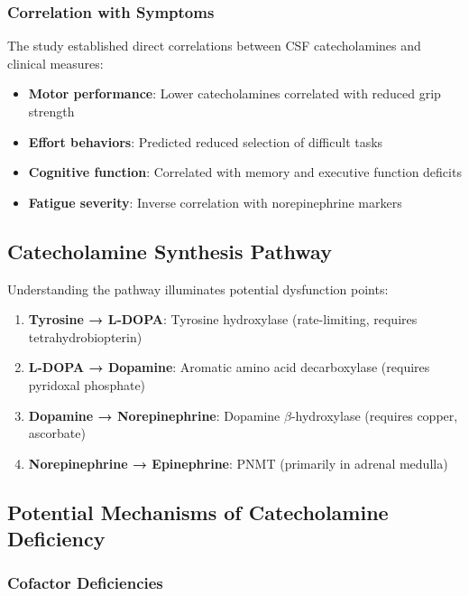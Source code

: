 \subsubsection{Correlation with Symptoms}

The study established direct correlations between CSF catecholamines and clinical measures:

\begin{itemize}
    \item \textbf{Motor performance}: Lower catecholamines correlated with reduced grip strength
    \item \textbf{Effort behaviors}: Predicted reduced selection of difficult tasks
    \item \textbf{Cognitive function}: Correlated with memory and executive function deficits
    \item \textbf{Fatigue severity}: Inverse correlation with norepinephrine markers
\end{itemize}

\subsection{Catecholamine Synthesis Pathway}

Understanding the pathway illuminates potential dysfunction points:

\begin{enumerate}
    \item \textbf{Tyrosine → L-DOPA}: Tyrosine hydroxylase (rate-limiting, requires tetrahydrobiopterin)
    \item \textbf{L-DOPA → Dopamine}: Aromatic amino acid decarboxylase (requires pyridoxal phosphate)
    \item \textbf{Dopamine → Norepinephrine}: Dopamine $\beta$-hydroxylase (requires copper, ascorbate)
    \item \textbf{Norepinephrine → Epinephrine}: PNMT (primarily in adrenal medulla)
\end{enumerate}

\subsection{Potential Mechanisms of Catecholamine Deficiency}

\subsubsection{Cofactor Deficiencies}

